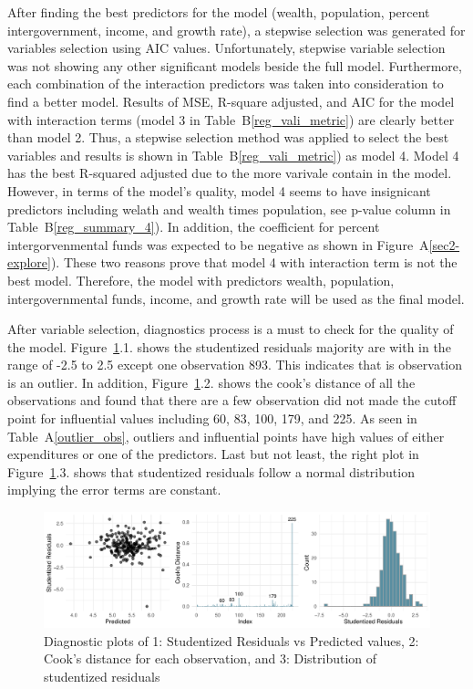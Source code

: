 \documentclass[11pt]{article}\usepackage[]{graphicx}\usepackage[]{color}
\makeatletter
\def\maxwidth{ %
  \ifdim\Gin@nat@width>\linewidth
    \linewidth
  \else
    \Gin@nat@width
  \fi
}
\makeatother
\begin{document}
\noindent After finding the best predictors for the model (wealth, population, percent intergovernment, income, and growth rate), a stepwise selection was generated for variables selection using AIC values. Unfortunately, stepwise variable selection was not showing any other significant models beside the full model. Furthermore, each combination of the interaction predictors was taken into consideration to find a better model. Results of MSE, R-square adjusted, and AIC for the model with interaction terms (model 3 in Table~B\ref{reg_vali_metric}) are clearly better than model 2. Thus, a stepwise selection method was applied to select the best variables and results is shown in Table~B\ref{reg_vali_metric}) as model 4. Model 4 has the best R-squared adjusted due to the more varivale contain in the model. However, in terms of the model's quality, model 4 seems to have insignicant predictors including welath and wealth times population, see p-value column in Table~B\ref{reg_summary_4}). In addition, the coefficient for percent intergorvenmental funds was expected to be negative as shown in Figure~A\ref{sec2-explore}). These two reasons prove that model 4 with interaction term is not the best model. Therefore, the model with predictors wealth, population, intergovernmental funds, income, and growth rate will be used as the final model.

\noindent After variable selection, diagnostics process is a must to check for the quality of the model. Figure~\ref{diag-plot1}.1. shows the studentized residuals majority are with in the range of -2.5 to 2.5 except one observation 893. This indicates that is observation is an outlier. In addition, Figure~\ref{diag-plot1}.2. shows the cook's distance of all the observations and found that there are a few observation did not made the cutoff point for influential values including 60, 83, 100, 179, and 225. As seen in Table~A\ref{outlier_obs}, outliers and influential points have high values of either expenditures or one of the predictors. Last but not least, the right plot in Figure~\ref{diag-plot1}.3. shows that studentized residuals follow a normal distribution implying the error terms are constant.    

\begin{figure}[h!] 
\begin{center}

\includegraphics[width=\maxwidth]{figure/unnamed-chunk-5-1} 

\caption{Diagnostic plots of 1: Studentized Residuals vs Predicted values, 2: Cook's distance for each observation, and 3: Distribution of studentized residuals}
\label{diag-plot1}
\end{center} 
\end{figure}
\end{document}
